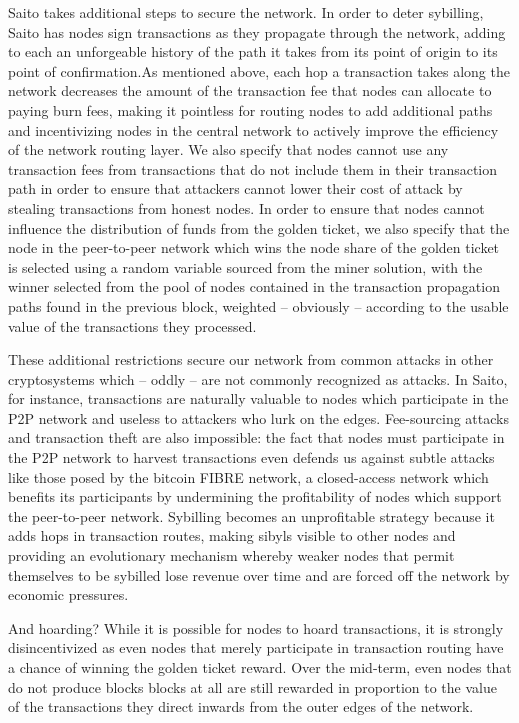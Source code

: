 \documentclass[11.5pt, oneside]{article}   	%
\begin{document}
\begin{multicols}{2}
Saito takes additional steps to secure the network. In order to deter sybilling, Saito has nodes sign transactions as they propagate through the network, adding to each an unforgeable history of the path it takes from its point of origin to its point of confirmation.As mentioned above, each hop a transaction takes along the network decreases the amount of the transaction fee that nodes can allocate to paying burn fees, making it pointless for routing nodes to add additional paths and incentivizing nodes in the central network to actively improve the efficiency of the network routing layer. We also specify that nodes cannot use any transaction fees from transactions that do not include them in their transaction path in order to ensure that attackers cannot lower their cost of attack by stealing transactions from honest nodes. In order to ensure that nodes cannot influence the distribution of funds from the golden ticket, we also specify that the node in the peer-to-peer network which wins the node share of the golden ticket is selected using a random variable sourced from the miner solution, with the winner selected from the pool of nodes contained in the transaction propagation paths found in the previous block, weighted -- obviously -- according to the usable value of the transactions they processed.

These additional restrictions secure our network from common attacks in other cryptosystems which -- oddly -- are not commonly recognized as attacks. In Saito, for instance, transactions are naturally valuable to nodes which participate in the P2P network and useless to attackers who lurk on the edges. Fee-sourcing attacks and transaction theft are also impossible: the fact that nodes must participate in the P2P network to harvest transactions even defends us against subtle attacks like those posed by the bitcoin FIBRE network, a closed-access network which benefits its participants by undermining the profitability of nodes which support the peer-to-peer network. Sybilling becomes an unprofitable strategy because it adds hops in transaction routes, making sibyls visible to other nodes and providing an evolutionary mechanism whereby weaker nodes that permit themselves to be sybilled lose revenue over time and are forced off the network by economic pressures. 

And hoarding? While it is possible for nodes to hoard transactions, it is strongly disincentivized as even nodes that merely participate in transaction routing have a chance of winning the golden ticket reward. Over the mid-term, even nodes that do not produce blocks blocks at all are still rewarded in proportion to the value of the transactions they direct inwards from the outer edges of the network.


\end{multicols}
\end{document}
